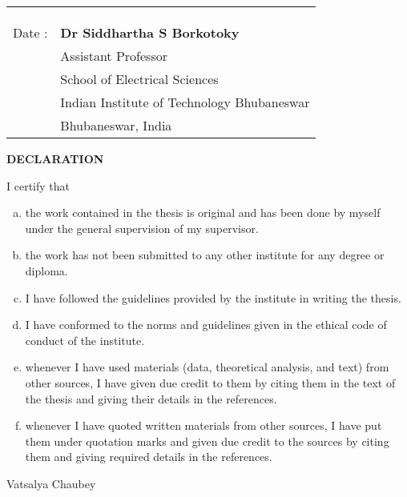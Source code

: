 \begin{tabular*}{\textwidth}{@{\extracolsep{\fill}}ll}
	&\\
	&\\
	&\\
	Date : & \textbf{Dr Siddhartha S Borkotoky}\\
	& Assistant Professor\\
	& School of Electrical Sciences \\
	& Indian Institute of Technology Bhubaneswar \\
	& Bhubaneswar, India \\
\end{tabular*}



\newpage

\thispagestyle{empty}
\begin{center}
	\textbf{\Large DECLARATION}
\end{center}
I certify that
\begin{enumerate}[a.]
	\item the work contained in the thesis is original and has been done by myself under the general supervision of my supervisor.
	\item the work has not been submitted to any other institute for any degree or diploma.
	\item I have followed the guidelines provided by the institute in writing the thesis.
	\item I have conformed to the norms and guidelines given in the ethical code of conduct of the institute.
	\item whenever I have used materials (data, theoretical analysis, and text) from other sources, I have given due credit to them by citing them in the text of the thesis and giving their details in the references.
	\item whenever I have quoted written materials from other sources, I have put them under quotation marks and given due credit to the sources by citing them and giving required details in the references.
\end{enumerate}
\vspace{4em}
\begin{flushright}
	Vatsalya Chaubey
\end{flushright}

